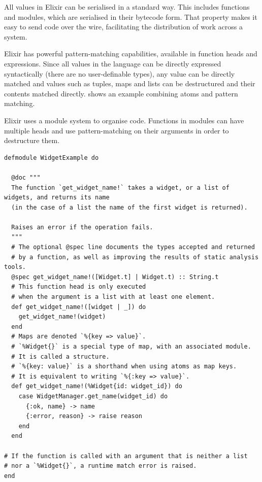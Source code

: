 All values in Elixir can be serialised in a standard way.
This includes functions and modules, which are serialised in their bytecode form.
That property makes it easy to send code over the wire, facilitating the distribution of work across a system.

Elixir has powerful pattern-matching capabilities, available in function heads and  expressions.
Since all values in the language can be directly expressed syntactically (there are no user-definable types), any value can be directly matched and values such as tuples, maps and lists can be destructured and their contents matched directly.
 shows an example combining atoms and pattern matching.

\begin{listing}[h]
	\caption[An example Elixir module, showcasing pattern-matching.]{Elixir uses a module system to organise code. Functions in modules can have multiple heads and use pattern-matching on their arguments in order to destructure them.}
	\label{lst:prep:pattern-matching-example}
	\begin{verbatim}
defmodule WidgetExample do

  @doc """
  The function `get_widget_name!` takes a widget, or a list of widgets, and returns its name
  (in the case of a list the name of the first widget is returned).

  Raises an error if the operation fails. 
  """
  # The optional @spec line documents the types accepted and returned
  # by a function, as well as improving the results of static analysis tools. 
  @spec get_widget_name!([Widget.t] | Widget.t) :: String.t
  # This function head is only executed
  # when the argument is a list with at least one element.
  def get_widget_name!([widget | _]) do
    get_widget_name!(widget)
  end
  # Maps are denoted `%{key => value}`.
  # `%Widget{}` is a special type of map, with an associated module.
  # It is called a structure.
  # `%{key: value}` is a shorthand when using atoms as map keys.
  # It is equivalent to writing `%{:key => value}`.  
  def get_widget_name!(%Widget{id: widget_id}) do
    case WidgetManager.get_name(widget_id) do
      {:ok, name} -> name
      {:error, reason} -> raise reason
    end
  end

# If the function is called with an argument that is neither a list
# nor a `%Widget{}`, a runtime match error is raised.
end
	\end{verbatim}
\end{listing}

